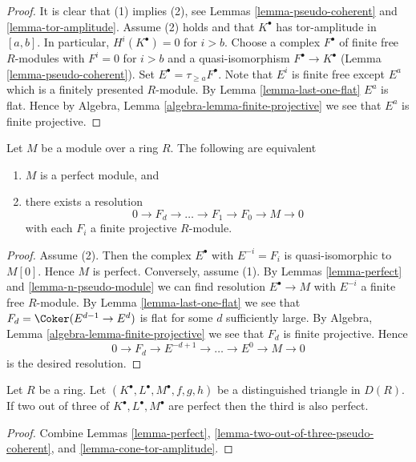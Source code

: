 \begin{proof}
It is clear that (1) implies (2), see
Lemmas \ref{lemma-pseudo-coherent} and \ref{lemma-tor-amplitude}.
Assume (2) holds and that $K^\bullet$ has tor-amplitude in $[a, b]$.
In particular, $H^i(K^\bullet) = 0$ for $i > b$.
Choose a complex $F^\bullet$ of finite free $R$-modules with
$F^i = 0$ for $i > b$ and a quasi-isomorphism $F^\bullet \to K^\bullet$
(Lemma \ref{lemma-pseudo-coherent}).
Set $E^\bullet = \tau_{\geq a}F^\bullet$. Note that $E^i$ is finite
free except $E^a$ which is a finitely presented $R$-module. By
Lemma \ref{lemma-last-one-flat} $E^a$ is flat. Hence by
Algebra, Lemma \ref{algebra-lemma-finite-projective}
we see that $E^a$ is finite projective.
\end{proof}

\begin{lemma}
\label{lemma-perfect-module}
Let $M$ be a module over a ring $R$. The following are equivalent
\begin{enumerate}
\item $M$ is a perfect module, and
\item there exists a resolution
$$
0 \to F_d \to \ldots \to F_1 \to F_0 \to M \to 0
$$
with each $F_i$ a finite projective $R$-module.
\end{enumerate}
\end{lemma}

\begin{proof}
Assume (2). Then the complex $E^\bullet$ with $E^{-i} = F_i$
is quasi-isomorphic to $M[0]$. Hence $M$ is perfect.
Conversely, assume (1). By
Lemmas \ref{lemma-perfect} and \ref{lemma-n-pseudo-module}
we can find resolution $E^\bullet \to M$ with $E^{-i}$ a finite free
$R$-module. By
Lemma \ref{lemma-last-one-flat}
we see that $F_d = \Coker(E^{d - 1} \to E^d)$ is flat for
some $d$ sufficiently large. By
Algebra, Lemma \ref{algebra-lemma-finite-projective}
we see that $F_d$ is finite projective.
Hence
$$
0 \to F_d \to E^{-d+1} \to \ldots \to E^0 \to M \to 0
$$
is the desired resolution.
\end{proof}

\begin{lemma}
\label{lemma-two-out-of-three-perfect}
Let $R$ be a ring. Let $(K^\bullet, L^\bullet, M^\bullet, f, g, h)$
be a distinguished triangle in $D(R)$. If two out of three of
$K^\bullet, L^\bullet, M^\bullet$ are
perfect then the third is also perfect.
\end{lemma}

\begin{proof}
Combine
Lemmas \ref{lemma-perfect}, \ref{lemma-two-out-of-three-pseudo-coherent}, and
\ref{lemma-cone-tor-amplitude}.
\end{proof}

